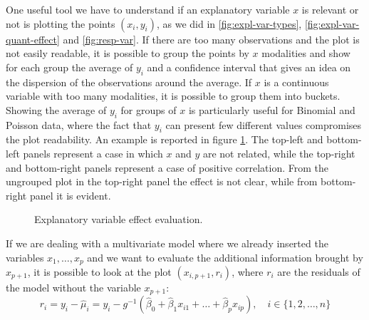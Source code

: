 \documentclass[a4paper, nobind]{templates/ociamthesis}
\theoremstyle{definition}
\theoremstyle{definition}
\theoremstyle{definition}
\theoremstyle{remark}
\begin{document}
One useful tool we have to understand if an explanatory variable \(x\) is relevant or not is plotting the points \((x_i, y_i)\), as we did in \ref{fig:expl-var-types}, \ref{fig:expl-var-quant-effect} and \ref{fig:resp-var}. If there are too many observations and the plot is not easily readable, it is possible to group the points by \(x\) modalities and show for each group the average of \(y_i\) and a confidence interval that gives an idea on the dispersion of the observations around the average. If \(x\) is a continuous variable with too many modalities, it is possible to group them into buckets. Showing the average of \(y_i\) for groups of \(x\) is particularly useful for Binomial and Poisson data, where the fact that \(y_i\) can present few different values compromises the plot readability. An example is reported in figure \ref{fig:var-selection}. The top-left and bottom-left panels represent a case in which \(x\) and \(y\) are not related, while the top-right and bottom-right panels represent a case of positive correlation. From the ungrouped plot in the top-right panel the effect is not clear, while from bottom-right panel it is evident.





\begin{figure}[!hbtp]

{\centering {}\newline{}

}

\caption{Explanatory variable effect evaluation.}\label{fig:var-selection}
\end{figure}

If we are dealing with a multivariate model where we already inserted the variables \(x_1, \dots, x_p\) and we want to evaluate the additional information brought by \(x_{p+1}\), it is possible to look at the plot \((x_{i, p+1}, r_i)\), where \(r_i\) are the residuals of the model without the variable \(x_{p+1}\):
\[
r_i = y_i - \hat{\mu}_i = y_i - g^{-1}\left( \hat{\beta}_0 + \hat{\beta}_1 x_{i1} + \dots + \hat{\beta}_p x_{ip} \right), \quad i\in\{1,2,\dots,n\}
\]
\end{document}
